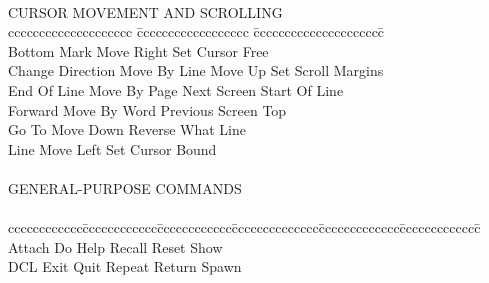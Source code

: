 \begin{tabbing}
 \\
 CURSOR MOVEMENT AND SCROLLING \\
cccccccccccccccccccc \= cccccccccccccccccc \= ccccccccccccccccccccc\= \kill
 \\
    Bottom          \> Mark         \> Move Right      \> Set Cursor Free    \\
    Change Direction\> Move By Line \> Move Up         \> Set Scroll Margins \\
    End Of Line     \> Move By Page \> Next Screen     \> Start Of Line      \\
    Forward         \> Move By Word \> Previous Screen \> Top                \\
    Go To           \> Move Down    \> Reverse         \> What Line          \\
    Line            \> Move Left    \> Set Cursor Bound\>                    \\
 \\
 GENERAL-PURPOSE COMMANDS \\
 \\
cccccccccccc\=cccccccccccc\=cccccccccccc\=cccccccccccccc\=ccccccccccccc\=ccccccccccccc\= \kill
    Attach \>  Do   \> Help  \>  Recall  \>   Reset   \>  Show        \\
    DCL    \>  Exit \> Quit  \>  Repeat  \>   Return  \>  Spawn       \\
\end{tabbing}

